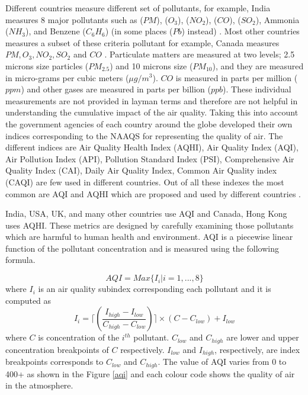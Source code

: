 Different countries measure different set of pollutants, for example, India measures 8 major pollutants such as ($PM$), ($O_3$), ($NO_2$), ($CO$), ($SO_2$), Ammonia ($NH_3$), and Benzene ($C_6H_6$) (in some places ($Pb$) instead) \cite{Chen2013}. Most other countries measures a subset of these criteria pollutant for example, Canada measures $PM, O_3, NO_2, SO_2$ and $CO$ \cite{Chen2013}. Particulate matters are measured at two levels; 2.5 microns size particles ($PM_{2.5}$) and 10 microns size ($PM_{10}$), and they are measured in micro-grams per cubic meters ($\mu g/m^3$). $CO$ is measured in parts per million ($ppm$) and other gases are measured in parts per billion ($ppb$). These individual measurements are not provided in layman terms and therefore are not helpful in understanding the cumulative impact of the air quality. Taking this into account the government agencies of each country around the globe developed their own indices corresponding to the NAAQS for representing the quality of air. The different indices are Air Quality Health Index (AQHI), Air Quality Index (AQI), Air Pollution Index (API), Pollution Standard Index (PSI), Comprehensive Air Quality Index (CAI), Daily Air Quality Index, Common Air Quality index (CAQI) are few used in different countries.
Out of all these indexes the most common are AQI and AQHI which are proposed and used by different countries \cite{Chen2013}.

India, USA, UK, and many other countries use AQI and Canada, Hong Kong uses AQHI. These metrics are designed  by carefully examining those pollutants which are harmful to human health and environment.
AQI is a piecewise linear function of the pollutant concentration \cite{Soni2016} and is measured using the following formula.

\begin{equation}
AQI = Max \{I_i|i = 1, ..., 8\}
\end{equation}
where $I_i$ is an air quality subindex corresponding each pollutant and it is computed as 
\begin{equation}
I_i = \lceil(\frac{I_{high} - I_{low}}{C_{high} - C_{low}})\rceil \times (C - C_{low}) + I_{low}
\end{equation}
where $C$ is concentration of the $i^{th}$ pollutant. $C_{low}$ and $C_{high}$ are lower and upper concentration breakpoints of $C$ respectively.
$I_{low}$ and $I_{high}$, respectively, are index breakpoints corresponds to $C_{low}$ and $C_{high}$.  The value of AQI varies from 0 to 400+ as shown in the Figure \ref{aqi} and each colour code shows the quality of air in the atmosphere.


